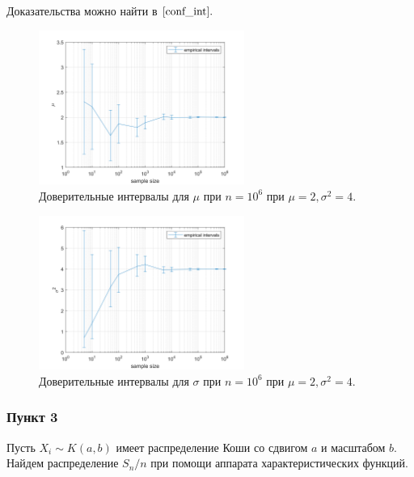 \documentclass[oneside, final, 12pt]{article}
\begin{document}
	Доказательства можно найти в $\cite{conf_int}.$

\newpage
	\begin{figure}[h!]
		\centering
		\includegraphics[width=0.6\textwidth]{../code/Task_5/pict/mu_conf.png}
		\caption{Доверительные интервалы для $\mu$ при $n=10^6$ 
						при $\mu = 2, \sigma^2  = 4$.}
    \end{figure}

	\begin{figure}[h!]
		\centering
		\includegraphics[width=0.6\textwidth]{../code/Task_5/pict/var_conf.png}
		\caption{Доверительные интервалы для $\sigma$ при $n=10^6$ 
						при $\mu = 2, \sigma^2  = 4$.}
    \end{figure}
	
\newpage
\subsubsection{Пункт 3}

	Пусть $X_i\sim K(a,b)$ имеет распределение Коши со сдвигом $a$ и масштабом $b$. 
	Найдем распределение $S_n/n$ при помощи аппарата характеристических функций.
\end{document}
